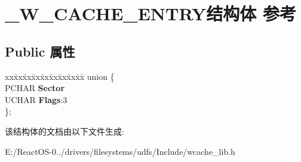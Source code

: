 \hypertarget{struct___w___c_a_c_h_e___e_n_t_r_y}{}\section{\+\_\+\+W\+\_\+\+C\+A\+C\+H\+E\+\_\+\+E\+N\+T\+R\+Y结构体 参考}
\label{struct___w___c_a_c_h_e___e_n_t_r_y}
\subsection*{Public 属性}
\begin{DoxyCompactItemize}
\item 
\mbox{\label{struct___w___c_a_c_h_e___e_n_t_r_y_a56f195ddd92fd1e34cbce01557317f70}} 
\begin{tabbing}
xx\=xx\=xx\=xx\=xx\=xx\=xx\=xx\=xx\=\kill
union \{\\
\>PCHAR {\bfseries Sector}\\
\>UCHAR {\bfseries Flags}:3\\
\}; \\

\end{tabbing}\end{DoxyCompactItemize}


该结构体的文档由以下文件生成\+:\begin{DoxyCompactItemize}
\item 
E\+:/\+React\+O\+S-\/0../drivers/filesystems/udfs/\+Include/wcache\+\_\+lib.\+h\end{DoxyCompactItemize}
